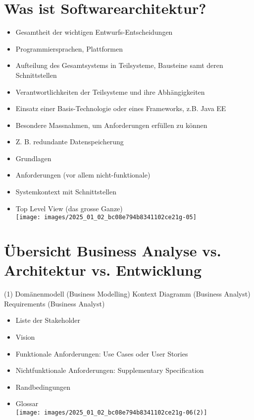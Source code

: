 \documentclass[10pt]{article}
\begin{document}
\section*{Was ist Softwarearchitektur?}
\begin{itemize}
  \item Gesamtheit der wichtigen Entwurfs-Entscheidungen
  \item Programmiersprachen, Plattformen
  \item Aufteilung des Gesamtsystems in Teilsysteme, Bausteine samt deren Schnittstellen
  \item Verantwortlichkeiten der Teilsysteme und ihre Abhängigkeiten
  \item Einsatz einer Basis-Technologie oder eines Frameworks, z.B. Java EE
  \item Besondere Massnahmen, um Anforderungen erfüllen zu können
  \item Z. B. redundante Datenspeicherung
  \item Grundlagen
  \item Anforderungen (vor allem nicht-funktionale)
  \item Systemkontext mit Schnittstellen
  \item Top Level View (das grosse Ganze)\\
\texttt{[image: images/2025\_01\_02\_bc08e794b8341102ce21g-05]}
\end{itemize}

\section*{Übersicht Business Analyse vs. Architektur vs. Entwicklung}
(1) Domänenmodell (Business Modelling) Kontext Diagramm (Business Analyst)\\
Requirements (Business Analyst)

\begin{itemize}
  \item Liste der Stakeholder
  \item Vision
  \item Funktionale Anforderungen: Use Cases oder User Stories
  \item Nichtfunktionale Anforderungen: Supplementary Specification
  \item Randbedingungen
  \item Glossar\\
\texttt{[image: images/2025\_01\_02\_bc08e794b8341102ce21g-06(2)]}
\end{itemize}
\end{document}
